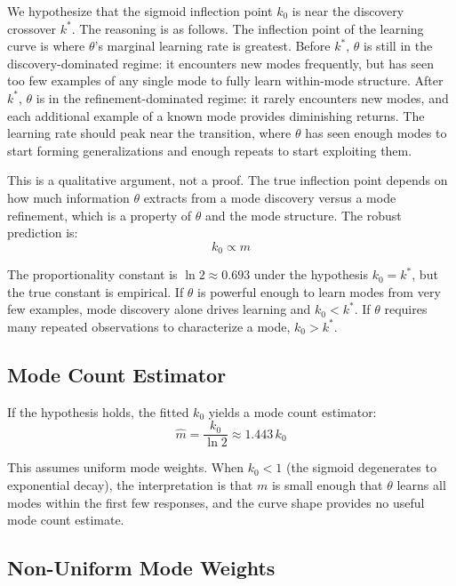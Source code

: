 We hypothesize that the sigmoid inflection point $k_0$ is near the discovery crossover $k^*$.
The reasoning is as follows.
The inflection point of the learning curve is where $\theta$'s marginal learning rate is greatest.
Before $k^*$, $\theta$ is still in the discovery-dominated regime: it encounters new modes frequently, but has seen too few examples of any single mode to fully learn within-mode structure.
After $k^*$, $\theta$ is in the refinement-dominated regime: it rarely encounters new modes, and each additional example of a known mode provides diminishing returns.
The learning rate should peak near the transition, where $\theta$ has seen enough modes to start forming generalizations and enough repeats to start exploiting them.

This is a qualitative argument, not a proof.
The true inflection point depends on how much information $\theta$ extracts from a mode discovery versus a mode refinement, which is a property of $\theta$ and the mode structure.
The robust prediction is:
\begin{equation}\label{eq:k0-proportional}
    k_0 \propto m
\end{equation}

The proportionality constant is $\ln 2 \approx 0.693$ under the hypothesis $k_0 = k^*$, but the true constant is empirical.
If $\theta$ is powerful enough to learn modes from very few examples, mode discovery alone drives learning and $k_0 < k^*$.
If $\theta$ requires many repeated observations to characterize a mode, $k_0 > k^*$.

\subsection{Mode Count Estimator}

If the hypothesis holds, the fitted $k_0$ yields a mode count estimator:
\begin{equation}\label{eq:mode-count-estimator}
    \hat{m} = \frac{k_0}{\ln 2} \approx 1.443\, k_0
\end{equation}

This assumes uniform mode weights.
When $k_0 < 1$ (the sigmoid degenerates to exponential decay), the interpretation is that $m$ is small enough that $\theta$ learns all modes within the first few responses, and the curve shape provides no useful mode count estimate.

\subsection{Non-Uniform Mode Weights}

